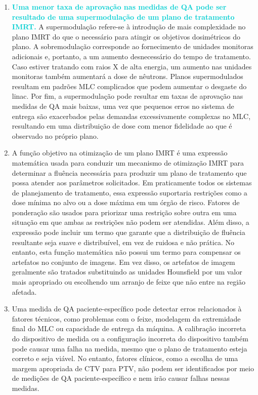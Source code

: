 \documentclass[11pt,a4paper]{article}
\begin{document}
\begin{enumerate}
        \item \textcolor{DarkTurquoise}{\textbf{Uma menor taxa de aprovação nas medidas de QA pode ser resultado de uma supermodulação de um plano de tratamento IMRT.}} A supermodulação refere-se à introdução de mais complexidade no plano IMRT do que o necessário para atingir os objetivos dosimétricos do plano. A sobremodulação corresponde ao fornecimento de unidades monitoras adicionais e, portanto, a um aumento desnecessário do tempo de tratamento. Caso estiver tratando com raios X de alta energia, um aumento nas unidades monitoras também aumentará a dose de nêutrons. Planos supermodulados resultam em padrões MLC complicados que podem aumentar o desgaste do linac. Por fim, a supermodulação pode resultar em taxas de aprovação nas medidas de QA mais baixas, uma vez que pequenos erros no sistema de entrega são exacerbados pelas demandas excessivamente complexas no MLC, resultando em uma distribuição de dose com menor fidelidade ao que é observado no próprio plano.

        \item A função objetivo na otimização de um plano IMRT é uma expressão matemática usada para conduzir um mecanismo de otimização IMRT para determinar a fluência necessária para produzir um plano de tratamento que possa atender aos parâmetros solicitados. Em praticamente todos os sistemas de planejamento de tratamento, essa expressão suportaria restrições como a dose mínima no alvo ou a dose máxima em um órgão de risco. Fatores de ponderação são usados para priorizar uma restrição sobre outra em uma situação em que ambas as restrições não podem ser atendidas. Além disso, a expressão pode incluir um termo que garante que a distribuição de fluência resultante seja suave e distribuível, em vez de ruidosa e não prática. No entanto, esta função matemática não possui um termo para compensar os artefatos no conjunto de imagens. Em vez disso, os artefatos de imagem geralmente são tratados substituindo as unidades Hounsfield por um valor mais apropriado ou escolhendo um arranjo de feixe que não entre na região afetada.

        \item Uma medida de QA paciente-específico pode detectar erros relacionados à fatores técnicos, como problemas com o feixe, modelagem da extremidade final do MLC ou capacidade de entrega da máquina. A calibração incorreta do dispositivo de medida ou a configuração incorreta do dispositivo também pode causar uma falha na medida, mesmo que o plano de tratamento esteja correto e seja viável. No entanto, fatores clínicos, como a escolha de uma margem apropriada de CTV para PTV, não podem ser identificados por meio de medições de QA paciente-específico e nem irão causar falhas nessas medidas.
        

\end{enumerate}
\end{document}
